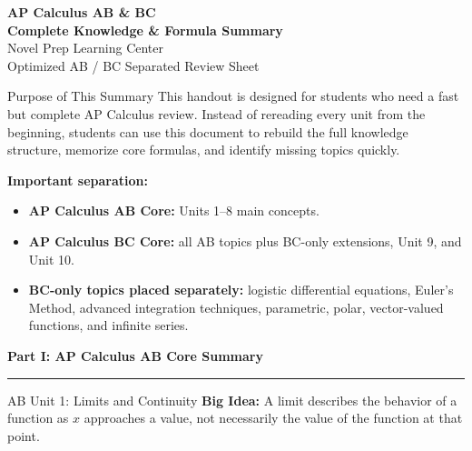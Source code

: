 \documentclass[11pt]{article}
\newcommand{\sectiontitle}[1]{
\vspace{0.8em}
{\Large\textcolor{novelPurpleDark}{\textbf{#1}}}
\vspace{0.35em}
\hrule
\vspace{0.8em}
}
\begin{document}

\begin{center}
    {\Huge \textbf{\textcolor{novelPurpleDark}{AP Calculus AB \& BC}}}\\[0.25em]
    {\LARGE \textbf{Complete Knowledge \& Formula Summary}}\\[0.5em]
    {\large Novel Prep Learning Center}\\[0.4em]
    {\normalsize Optimized AB / BC Separated Review Sheet}
\end{center}

\vspace{0.6em}

\begin{unitbox}{Purpose of This Summary}
This handout is designed for students who need a fast but complete AP Calculus review.  
Instead of rereading every unit from the beginning, students can use this document to rebuild the full knowledge structure, memorize core formulas, and identify missing topics quickly.

\medskip

\textbf{Important separation:}
\begin{itemize}[leftmargin=1.5em]
\item \textbf{AP Calculus AB Core:} Units 1--8 main concepts.
\item \textbf{AP Calculus BC Core:} all AB topics plus BC-only extensions, Unit 9, and Unit 10.
\item \textbf{BC-only topics placed separately:} logistic differential equations, Euler's Method, advanced integration techniques, parametric, polar, vector-valued functions, and infinite series.
\end{itemize}
\end{unitbox}

\newpage


\sectiontitle{Part I: AP Calculus AB Core Summary}

\begin{unitbox}{AB Unit 1: Limits and Continuity}
\textbf{Big Idea:} A limit describes the behavior of a function as \(x\) approaches a value, not necessarily the value of the function at that point.
\end{unitbox}
\end{document}
